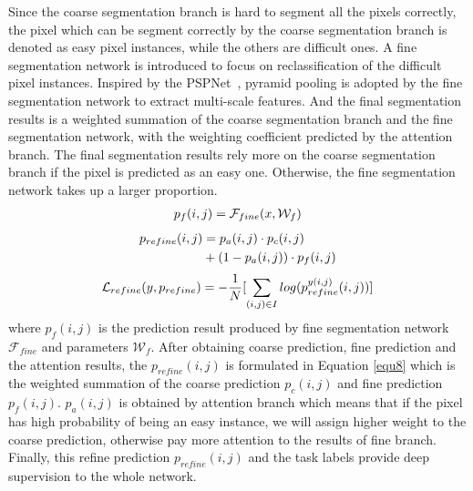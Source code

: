 \documentclass[10.5pt,compsoc]{TsT}
\newcommand{\upcite}[1]{\superscript{\textsuperscript{\cite{#1}}}}
\theoremstyle{mystyle}
\newcommand{\upcite}[1]{\textsuperscript{\cite{#1}}}
\begin{document}
{Since the coarse segmentation branch is hard to segment all the pixels correctly, the pixel which can be segment correctly by the coarse segmentation branch is denoted as easy pixel instances, while the others are difficult ones.
A fine segmentation network is introduced to focus on reclassification of the difficult pixel instances. Inspired by the PSPNet~\upcite{21}, pyramid pooling is adopted by the fine segmentation network to extract multi-scale features. And the final segmentation results is a weighted summation of the coarse segmentation branch and the fine segmentation network, with the weighting coefficient predicted by the attention branch. The final segmentation results rely more on the coarse segmentation branch if the pixel is predicted as an easy one. Otherwise, the fine segmentation network takes up a larger proportion. 
\begin{equation}\label{equ7}
\setlength\abovedisplayskip{8pt}
\setlength\belowdisplayskip{8pt}
\begin{split}
p_{f}(i,j) = \mathcal{F}_{fine}(x, \mathcal{W}_f)\\
\end{split}
\end{equation}
\begin{equation}\label{equ8}
\setlength\abovedisplayskip{8pt}
\setlength\belowdisplayskip{8pt}
\begin{split}
p_{refine}(i,j) &= p_{a}(i,j) \cdot p_{c}(i,j)\\
&+ (1-p_{a}(i,j)) \cdot p_{f}(i,j)\\
\end{split}
\end{equation}
\begin{equation}\label{equ9}
\setlength\abovedisplayskip{8pt}
\setlength\belowdisplayskip{8pt}
\begin{split}
\mathcal{L}_{refine}(y, p_{refine}) = - \frac{1}{N}[\sum_{(i,j)\in I}log(p^{y(i,j)}_{refine}(i,j))]\\
\end{split}
\end{equation}
where $p_{f}(i,j)$ is the prediction result produced by fine segmentation network $\mathcal{F}_{fine}$ and parameters $\mathcal{W}_f$. After obtaining coarse prediction, fine prediction and the attention results, the $p_{refine}(i,j)$ is formulated in Equation \ref{equ8} which is the weighted  summation of the coarse prediction $p_{c}(i,j)$ and fine prediction $p_{f}(i,j)$. $p_{a}(i,j)$ is obtained by attention branch which means that if the pixel has high probability of being an easy instance, we will assign higher weight to the coarse prediction, otherwise pay more attention to the results of fine branch. Finally, this refine prediction $p_{refine}(i,j)$ and the task labels provide deep supervision to the whole network.

}
\end{document}
